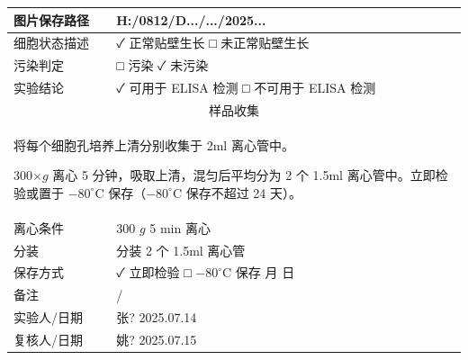 \documentclass[UTF8,10pt,a4paper,fontset=fandol]{ctexart}
\renewcommand{\arraystretch}{1.15}
\newcommand{\fieldvalue}[1]{#1}
\newcommand{\handwritten}[1]{#1}
\begin{document}
\renewcommand{\arraystretch}{1.35}
\begin{tabularx}{\textwidth}{|p{3.0cm}|X|}
\hline
图片保存路径
&
\fieldvalue{\handwritten{H:/0812/D.../.../2025...}}
\\
\hline
细胞状态描述
&
\fieldvalue{\handwritten{✓ 正常贴壁生长}}
\quad □ 未正常贴壁生长
\\
\hline
污染判定
&
□ 污染
\quad
\fieldvalue{\handwritten{✓ 未污染}}
\\
\hline
实验结论
&
\fieldvalue{\handwritten{✓ 可用于 ELISA 检测}}
\quad □ 不可用于 ELISA 检测
\\
\hline
\multicolumn{2}{|c|}{样品收集}\\
\hline
\multicolumn{2}{|p{\dimexpr\textwidth-2\tabcolsep-2\arrayrulewidth}|}{
将每个细胞孔培养上清分别收集于 2ml 离心管中。

300$\times g$ 离心 5 分钟，吸取上清，混匀后平均分为 2 个 1.5ml 离心管中。立即检验或置于 $-80^\circ$C 保存（$-80^\circ$C 保存不超过 24 天）。
}\\
\hline
离心条件
&
\fieldvalue{\handwritten{300}}
\quad $g$
\qquad
\fieldvalue{\handwritten{5}}
\quad min 离心
\\
\hline
分装
&
分装
\fieldvalue{\handwritten{2}}
个 1.5ml 离心管
\\
\hline
保存方式
&
\fieldvalue{\handwritten{✓ 立即检验}}
\qquad □ $-80^\circ$C 保存 \quad
\underline{\hspace{0.8cm}} 月 \quad
\underline{\hspace{0.8cm}} 日
\\
\hline
备注
&
\fieldvalue{\handwritten{/}}
\\
\hline
实验人/日期
&
\fieldvalue{\handwritten{张? 2025.07.14}}
\\
\hline
复核人/日期
&
\fieldvalue{\handwritten{姚? 2025.07.15}}
\\
\hline
\end{tabularx}
\end{document}
